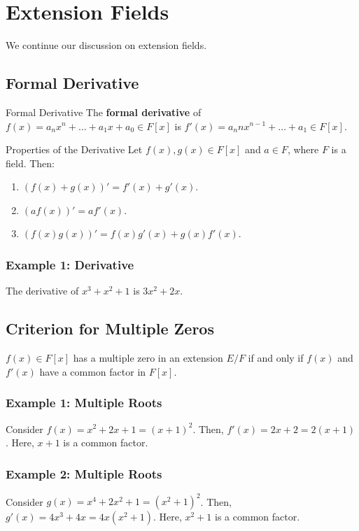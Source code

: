 \documentclass[letterpaper]{article}
\begin{document}
\section{Extension Fields}
We continue our discussion on extension fields. 

\subsection{Formal Derivative}
\begin{definition}{Formal Derivative}{}
    The \textbf{formal derivative} of $f(x) = a_n x^n + \dots + a_1 x + a_0 \in F[x]$ is $f'(x) = a_n n x^{n - 1} + \dots + a_1 \in F[x]$. 
\end{definition}

\begin{lemma}{Properties of the Derivative}{}
    Let $f(x), g(x) \in F[x]$ and $a \in F$, where $F$ is a field. Then: 
    \begin{enumerate}
        \item $(f(x) + g(x))' = f'(x) + g'(x)$.
        \item $(af(x))' = af'(x)$.
        \item $(f(x)g(x))' = f(x)g'(x) + g(x)f'(x)$. 
    \end{enumerate}
\end{lemma}

\subsubsection{Example 1: Derivative}
The derivative of $x^3 + x^2 + 1$ is $3x^2 + 2x$. 

\subsection{Criterion for Multiple Zeros}
\begin{theorem}{}{}
    $f(x) \in F[x]$ has a multiple zero in an extension $E / F$ if and only if $f(x)$ and $f'(x)$ have a common factor in $F[x]$. 
\end{theorem}

\subsubsection{Example 1: Multiple Roots}
Consider $f(x) = x^2 + 2x + 1 = (x + 1)^2$. Then, $f'(x) = 2x + 2 = 2(x + 1)$. Here, $x + 1$ is a common factor. 

\subsubsection{Example 2: Multiple Roots}
Consider $g(x) = x^4 + 2x^2 + 1 = (x^2 + 1)^2$. Then, $g'(x) = 4x^3 + 4x = 4x(x^2 + 1)$. Here, $x^2 + 1$ is a common factor. 
\end{document}
